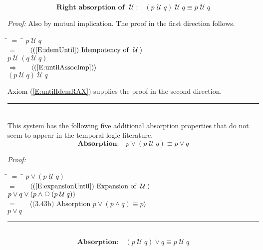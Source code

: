 \documentclass[fleqn, leqno]{article}
\newcommand{\lgap}{2pt}                             %
\newcommand{\mymathindent}{24pt}                    %
\newcommand{\impl}{\ensuremath{\Rightarrow}}        %
\newcommand{\Until}{\;\mathcal{U}\;}
\newcommand{\Next}{\;\,\text{\raisebox{3.5pt}{\circle{6}}}}
\newcommand{\myqed}{\hfill\rule[-.23ex]{1.2ex}{2.0ex}}
\newcommand{\Gll} {\langle}                         %
\newcommand{\Ggg} {\rangle}                         %
\newcommand{\Hint}[1]     {\ \ \ $\Gll              \mbox{#1} \Ggg$ }   %
\begin{document}
\begin{equation}\label{E:untilIdemR}
\textbf{Right absorption of $\Until$:}\quad (p \Until q) \Until q \equiv p \Until q
\end{equation}

\emph{Proof:} Also by mutual implication.
The proof in the first direction follows.
\begin{tabbing}
\hspace{\mymathindent} \= $= \;$ \= \kill
  \> \>   $p \Until q$\\[\lgap]
  \> $=$  \>  \Hint{(\ref{E:idemUntil}) Idempotency of $\Until$}\\[\lgap]
  \> \>   $p \Until (q \Until q)$\\[\lgap]
  \> $\impl$  \>  \Hint{(\ref{E:untilAssocImp})}\\[\lgap]
  \> \>   $(p \Until q) \Until q$
\end{tabbing}

Axiom (\ref{E:untilIdemRAX}) supplies the proof in the second direction.
\myqed\\[\lgap]

This system has the following five additional absorption properties that do not seem to
appear in the temporal logic literature.
\begin{equation}\label{E:untilOrP}
\textbf{Absorption:}\quad p \lor (p \Until q) \equiv p \lor q
\end{equation}

\emph{Proof:}
\begin{tabbing}
\hspace{\mymathindent} \= $= \;$ \= \kill
  \> \>   $p \lor (p \Until q)$\\[\lgap]
  \> $=$  \>  \Hint{(\ref{E:expansionUntil}) Expansion of $\Until$}\\[\lgap]
  \> \>   $p \lor q \lor (p \land \Next(p \Until q))$\\[\lgap]
  \> $=$  \>  \Hint{(3.43b) Absorption $p \lor (p \land q) \equiv p$}\\[\lgap]
  \> \>   $p \lor q$
\end{tabbing}
\myqed\\[\lgap]

\begin{equation}\label{E:untilOrQ}
\textbf{Absorption:}\quad (p \Until q) \lor q \equiv p \Until q
\end{equation}
\end{document}
